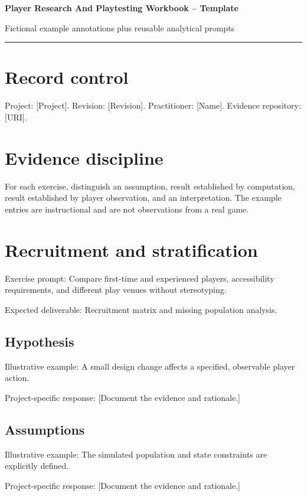 \documentclass[11pt]{article}
\begin{document}
{\huge\bfseries\color{suiteblue} Player Research And Playtesting Workbook -- Template}\par
\vspace{0.15in}
{\normalsize\color{suitegray} Fictional example annotations plus reusable analytical prompts}\par
\vspace{0.15in}\hrule\vspace{0.15in}

\section{Record control}
Project: [Project]. Revision: [Revision]. Practitioner: [Name]. Evidence repository: [URI].


\section{Evidence discipline}
For each exercise, distinguish an assumption, result established by computation, result established by player observation, and an interpretation. The example entries are instructional and are not observations from a real game.


\section{Recruitment and stratification}
Exercise prompt: Compare first-time and experienced players, accessibility requirements, and different play venues without stereotyping.

Expected deliverable: Recruitment matrix and missing population analysis.


\subsection{Hypothesis}
Illustrative example: A small design change affects a specified, observable player action.

Project-specific response: [Document the evidence and rationale.]


\subsection{Assumptions}
Illustrative example: The simulated population and state constraints are explicitly defined.

Project-specific response: [Document the evidence and rationale.]
\end{document}

